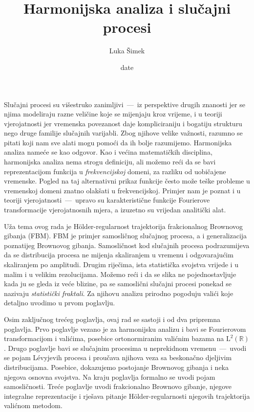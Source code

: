 \documentclass[a4paper,twoside,12pt]{memoir}
\title{Harmonijska analiza i slu\v{c}ajni procesi}
\author{Luka Šimek}
\date{date}
\let\oldcite\cite
\renewcommand{\cite}[2][]{%
    \def\tmp{#1}%
    \ifx\tmp\empty
        \mbox{\oldcite{#2}}%
    \else
        \mbox{\oldcite[\tmp]{#2}}%
    \fi
}
\numberwithin{teorem}{section}
\numberwithin{equation}{chapter}
\numberwithin{figure}{chapter}
\numberwithin{table}{chapter}
\newcommand{\R}{\mathbb{R}}
\newcommand{\holder}{H\" older}
\newcommand{\levy}{L\' evy}
\def\L{\mathrm{L}}
\begin{document}
\frontmatter

\begin{intro}
	Slučajni procesi su višestruko zanimljivi~---~iz perspektive drugih znanosti jer
	se njima modeliraju razne veličine koje se mijenjaju kroz vrijeme, i u teoriji vjerojatnosti
	jer vremenska povezanost daje kompliciraniju i bogatiju strukturu nego druge familije slučajnih varijabli.
	Zbog njihove velike važnosti, razumno se pitati koji nam
	sve alati mogu pomoći da ih bolje razumijemo. Harmonijska analiza nameće se kao odgovor.
	Kao i većina matematičkih disciplina, harmonijska analiza nema strogu definiciju, ali
	možemo reći da se bavi reprezentacijom funkcija u \emph{frekvencijskoj} domeni, za razliku
	od uobičajene vremenske. Pogled na taj alternativni prikaz funkcije često može teške
	probleme u vremenskoj domeni znatno olakšati u frekvencijskoj. Primjer nam
	je poznat i u teoriji vjerojatnosti~---~upravo su karakteristične funkcije Fourierove transformacije
	vjerojatnosnih mjera, a izuzetno su vrijedan analitički alat.

	Uža tema ovog rada je \holder -regularnost trajektorija frakcionalnog Brownovog gibanja (FBM).
	FBM je primjer samosličnog slučajnog procesa, a i generalizacija poznatijeg Brownovog gibanja. Samosličnost kod slučajnih procesa
	podrazumijeva da se distribucija procesa ne mijenja skaliranjem u vremenu i odgovarajućim skaliranjem po amplitudi. Drugim riječima, ista statistička svojstva
	vrijede i u malim i u velikim rezolucijama.
	Možemo reći i da se slika ne pojednostavljuje kada ju se gleda iz veće blizine, pa se
	samoslični slučajni procesi ponekad se nazivaju \emph{statistički fraktali}.
	Za njihovu analizu prirodno pogoduju valići koje detaljno uvodimo u prvom poglavlju.%

	Osim zaključnog trećeg poglavlja, ovaj rad se sastoji i od dva pripremna poglavlja.
	Prvo poglavlje vezano je za harmonijsku analizu i bavi se Fourierovom transformacijom
	i valićima, posebice ortonormiranim valićnim bazama na \( \L^2(\R) \).
	Drugo poglavlje bavi se slučajnim procesima u neprekidnom vremenu~---~uvodi se pojam \levy jevih
	procesa i proučava njihova veza sa beskonačno djeljivim distribucijama. Posebice, dokazujemo
	postojanje Brownovog gibanja i neka njegova osnovna svojstva. Na kraju poglavlja formalno se uvodi pojam samosličnosti.
	Treće poglavlje uvodi frakcionalno Brownovo gibanje, njegove integralne reprezentacije i
	rješava pitanje \holder -regularnosti njegovih trajektorija valićnom metodom.


\end{intro}
\end{document}
